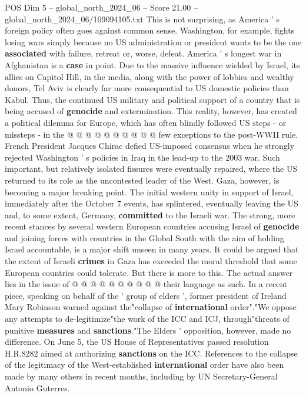 \begin{textsample}{POS Dim 5 – global\_north\_2024\_06 – Score 21.00 – global\_north\_2024\_06/109094105.txt}
This is not surprising, as America ' s foreign policy often goes against common sense.
Washington, for example, fights losing wars simply because no US administration or president wants to be the one \textbf{associated} with failure, retreat or, worse, defeat.
America ' s longest war in Afghanistan is a \textbf{case} in point.
Due to the massive influence wielded by Israel, its allies on Capitol Hill, in the media, along with the power of lobbies and wealthy donors, Tel Aviv is clearly far more consequential to US domestic policies than Kabul.
Thus, the continued US military and political support of a country that is being accused of \textbf{genocide} and extermination.
This reality, however, has created a political dilemma for Europe, which has often blindly followed US steps - or missteps - in the @ @ @ @ @ @ @ @ @ @ few exceptions to the post-WWII rule.
French President Jacques Chirac defied US-imposed consensus when he strongly rejected Washington ' s policies in Iraq in the lead-up to the 2003 war.
Such important, but relatively isolated fissures were eventually repaired, where the US returned to its role as the uncontested leader of the West.
Gaza, however, is becoming a major breaking point.
The initial western unity in support of Israel, immediately after the October 7 events, has splintered, eventually leaving the US and, to some extent, Germany, \textbf{committed} to the Israeli war.
The strong, more recent stances by several western European countries accusing Israel of \textbf{genocide} and joining forces with countries in the Global South with the aim of holding Israel accountable, is a major shift unseen in many years.
It could be argued that the extent of Israeli \textbf{crimes} in Gaza has exceeded the moral threshold that some European countries could tolerate.
But there is more to this.
The actual answer lies in the issue of @ @ @ @ @ @ @ @ @ @ their language as such.
In a recent piece, speaking on behalf of the ' group of elders ', former president of Ireland Mary Robinson warned against the"collapse of \textbf{international} order"."We oppose any attempts to de-legitimize"the work of the ICC and ICJ, through"threats of punitive \textbf{measures} and \textbf{sanctions}."The Elders ' opposition, however, made no difference.
On June 5, the US House of Representatives passed resolution H.R.8282 aimed at authorizing \textbf{sanctions} on the ICC.
References to the collapse of the legitimacy of the West-established \textbf{international} order have also been made by many others in recent months, including by UN Secretary-General Antonio Guterres.

\end{textsample}
